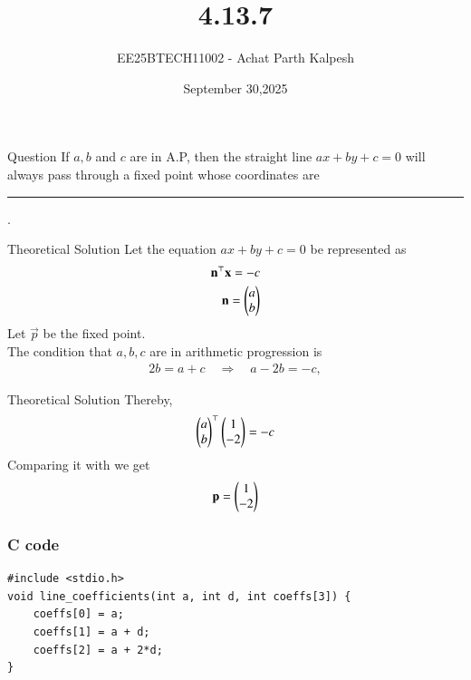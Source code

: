 \documentclass{beamer}
\title %
{4.13.7}
\date{September 30,2025}
\author %
{EE25BTECH11002 - Achat Parth Kalpesh}
\begin{document}
\frame{\titlepage}

\begin{frame}{Question}
If $a,b$ and $c$ are in A.P, then the straight line $ax +by +c=0$ will always pass through a fixed point whose coordinates are \rule{1cm}{0.01pt}.
\end{frame}

\begin{frame}{Theoretical Solution}
Let the equation $ax +by +c=0$ be represented as
\begin{align}
\label{eq:0.1}
    \mathbf{n}^\top \mathbf{x} = -c\\
    \mathbf{n} = \begin{pmatrix}a\\b\end{pmatrix}
\end{align}
Let $\vec{p}$ be the fixed point.\\
The condition that $a,b,c$ are in arithmetic progression is
\begin{align}
    2b=a+c \quad\Longrightarrow\quad  a - 2b = -c,
    \label{eq:0.3}
\end{align}
\end{frame}
\begin{frame}{Theoretical Solution}
Thereby,
\begin{align}
  \begin{pmatrix}a\\b\end{pmatrix}^\top \begin{pmatrix}1\\-2\end{pmatrix} = -c
\end{align}
Comparing it with  we get
\begin{align}
    \mathbf{p} = \begin{pmatrix}1\\-2\end{pmatrix}
\end{align}
\end{frame}
\begin{frame}[fragile]
    \frametitle{C code}
    \begin{lstlisting}
#include <stdio.h>
void line_coefficients(int a, int d, int coeffs[3]) {
    coeffs[0] = a;       
    coeffs[1] = a + d;   
    coeffs[2] = a + 2*d;
}
    \end{lstlisting}
\end{frame}
\end{document}
